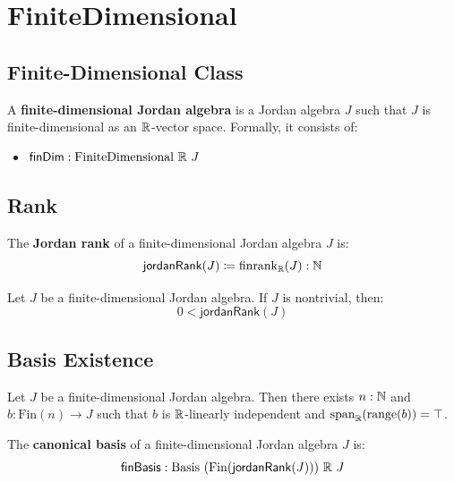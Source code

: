 \section{FiniteDimensional}

\subsection{Finite-Dimensional Class}

\begin{definition}[FinDimJordanAlgebra]
A \textbf{finite-dimensional Jordan algebra} is a Jordan algebra $J$ such that $J$ is finite-dimensional as an $\mathbb{R}$-vector space. Formally, it consists of:
\begin{itemize}
  \item $\mathsf{finDim} : \mathrm{FiniteDimensional}\ \mathbb{R}\ J$
\end{itemize}
\end{definition}

\subsection{Rank}

\begin{definition}[jordanRank]
The \textbf{Jordan rank} of a finite-dimensional Jordan algebra $J$ is:
\[ \mathsf{jordanRank}(J) \coloneqq \mathrm{finrank}_{\mathbb{R}}(J) : \mathbb{N} \]
\end{definition}

\begin{theorem}
Let $J$ be a finite-dimensional Jordan algebra. If $J$ is nontrivial, then:
\[ 0 < \mathsf{jordanRank}(J) \]
\end{theorem}

\subsection{Basis Existence}

\begin{theorem}
Let $J$ be a finite-dimensional Jordan algebra. Then there exists $n : \mathbb{N}$ and $b : \mathrm{Fin}(n) \to J$ such that $b$ is $\mathbb{R}$-linearly independent and $\mathrm{span}_{\mathbb{R}}(\mathrm{range}(b)) = \top$.
\end{theorem}

\begin{definition}[finBasis]
The \textbf{canonical basis} of a finite-dimensional Jordan algebra $J$ is:
\[ \mathsf{finBasis} : \mathrm{Basis}\ (\mathrm{Fin}(\mathsf{jordanRank}(J)))\ \R\ J \]
\end{definition}

